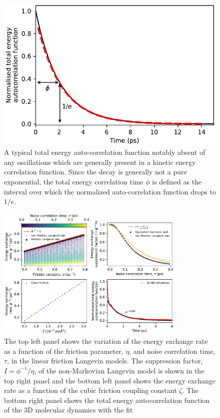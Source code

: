\documentclass[7pt]{article}
\begin{document}
\begin{figure}
	\centering
	\includegraphics[width=1.0\columnwidth]{e_auto}
	\caption{A typical total energy auto-correlation function notably absent of any oscillations which are generally present in a kinetic energy correlation function. Since the decay is generally not a pure exponential, the total energy correlation time $\phi$ is defined as the interval over which the normalized auto-correlation function drops to $1/e$.}
	\label{fig:e_auto}
\end{figure}

\begin{figure}
	\centering
	\includegraphics[width=0.8\textwidth]{energy_exchange_rates}
	\caption{The top left panel shows the variation of the energy exchange rate as a function of the friction parameter, $\eta$, and noise correlation time, $\tau$, in the linear friction Langevin models. The suppression factor, $I=\phi^{-1}/\eta$, of the non-Markovian Langevin model is shown in the top right panel and the bottom left panel shows the energy exchange rate as a function of the cubic friction coupling constant $\zeta$. The bottom right panel shows the total energy autocorrelation function of the 3D molecular dynamics with the fit }
	\label{fig:energy_exchange_rates}
\end{figure}
\end{document}
